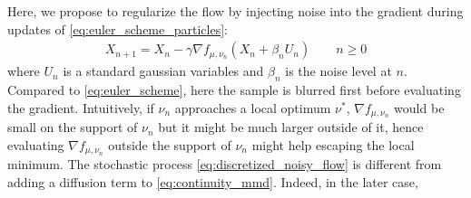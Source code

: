 Here, we propose to regularize the flow by injecting noise into the gradient during updates of \cref{eq:euler_scheme_particles}:   
\begin{align}\label{eq:discretized_noisy_flow}
	X_{n+1} = X_{n} -\gamma \nabla f_{\mu,\nu_n}(X_n+ \beta_n U_n) \qquad n\geq 0
\end{align}
where $U_n$ is a standard gaussian variables and $\beta_n$ is the noise level at $n$. Compared to \cref{eq:euler_scheme}, here the sample is blurred first before evaluating the gradient.
Intuitively, if $\nu_n$ approaches a local optimum $\nu^{*}$, $ \nabla f_{\mu,\nu_n}$ would be small on the support of $\nu_n$ but it might be much larger outside of it, hence evaluating $\nabla f_{\mu,\nu_n}$ outside the support of $\nu_n$ might help escaping the local minimum. The stochastic process \cref{eq:discretized_noisy_flow} is different from adding a diffusion term to \cref{eq:continuity_mmd}. Indeed, in the later case, %
